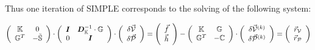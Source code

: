 \newpage
Thus one iteration of SIMPLE corresponds to the solving of the following system:

\[
\left(
\begin{array}{cc}
{\mathbb{K}} & 0 \\ 
{\mathbb{G}}^T & -\tilde{{\mathbb{S}}}
\end{array}
\right)
\cdot
\left(
\begin{array}{cc}
{\bm I} & {\bm D}_{\mathbb{K}}^{-1} \cdot {\mathbb{G}} \\
0 & {\bm I} 
\end{array}
\right)
\cdot
\left(
\begin{array}{c}
\delta \vec{\cal V} \\ \delta \vec{\cal P}
\end{array}
\right)
=
\left(
\begin{array}{c}
\vec{f} \\ \vec{h}
\end{array}
\right)
-
\left(
\begin{array}{cc}
{\mathbb{K}} & {\mathbb{G}} \\ {\mathbb{G}}^T & -{\mathbb{C}} 
\end{array}
\right)
\cdot
\left(
\begin{array}{c}
\delta \vec{\cal V}^{(k)} \\ \delta \vec{\cal P}^{(k)}
\end{array}
\right)
=
\left(
\begin{array}{c}
\vec{r}_{\cal V} \\ \vec{r}_{\cal P}
\end{array}
\right)
\]


